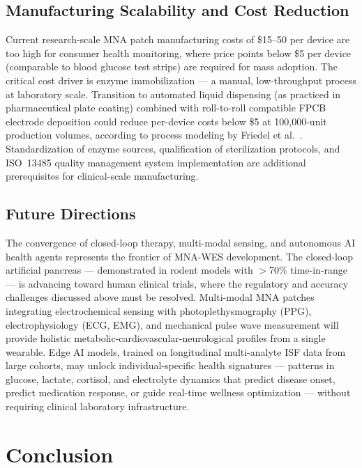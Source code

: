 \documentclass[review,1p]{elsarticle}
\begin{document}
\subsection{Manufacturing Scalability and Cost Reduction}
\label{subsec:cost}

Current research-scale MNA patch manufacturing costs of \$15--50 per device are too high for consumer health monitoring, where price points below \$5 per device (comparable to blood glucose test strips) are required for mass adoption. The critical cost driver is enzyme immobilization — a manual, low-throughput process at laboratory scale. Transition to automated liquid dispensing (as practiced in pharmaceutical plate coating) combined with roll-to-roll compatible FPCB electrode deposition could reduce per-device costs below \$5 at 100,000-unit production volumes, according to process modeling by Friedel et al.\ \cite{Friedel2023}. Standardization of enzyme sources, qualification of sterilization protocols, and ISO~13485 quality management system implementation are additional prerequisites for clinical-scale manufacturing.

\subsection{Future Directions}
\label{subsec:future}

The convergence of closed-loop therapy, multi-modal sensing, and autonomous AI health agents represents the frontier of MNA-WES development. The closed-loop artificial pancreas — demonstrated in rodent models with $>$70\% time-in-range \cite{Liu2025ClosedLoop} — is advancing toward human clinical trials, where the regulatory and accuracy challenges discussed above must be resolved. Multi-modal MNA patches integrating electrochemical sensing with photoplethysmography (PPG), electrophysiology (ECG, EMG), and mechanical pulse wave measurement will provide holistic metabolic-cardiovascular-neurological profiles from a single wearable. Edge AI models, trained on longitudinal multi-analyte ISF data from large cohorts, may unlock individual-specific health signatures — patterns in glucose, lactate, cortisol, and electrolyte dynamics that predict disease onset, predict medication response, or guide real-time wellness optimization — without requiring clinical laboratory infrastructure.


\section{Conclusion}
\label{sec:conclusion}
\end{document}
